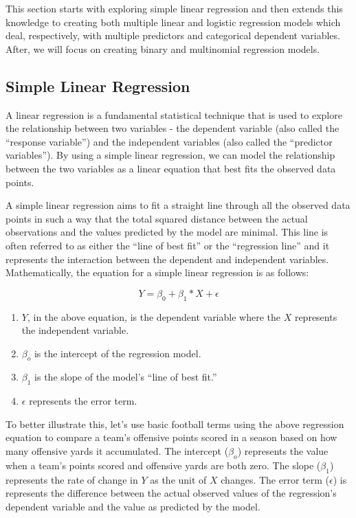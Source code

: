 \documentclass[
  letterpaper,
]{krantz}
\providecommand{\tightlist}{%
  \setlength{\itemsep}{0pt}\setlength{\parskip}{0pt}}\usepackage{longtable,booktabs,array}
\begin{document}
This section starts with exploring simple linear regression and then
extends this knowledge to creating both multiple linear and logistic
regression models which deal, respectively, with multiple predictors and
categorical dependent variables. After, we will focus on creating binary
and multinomial regression models.

\hypertarget{simple-linear-regression}{%
\subsection{Simple Linear Regression}\label{simple-linear-regression}}

A linear regression is a fundamental statistical technique that is used
to explore the relationship between two variables - the dependent
variable (also called the ``response variable'') and the independent
variables (also called the ``predictor variables''). By using a simple
linear regression, we can model the relationship between the two
variables as a linear equation that best fits the observed data points.

A simple linear regression aims to fit a straight line through all the
observed data points in such a way that the total squared distance
between the actual observations and the values predicted by the model
are minimal. This line is often referred to as either the ``line of best
fit'' or the ``regression line'' and it represents the interaction
between the dependent and independent variables. Mathematically, the
equation for a simple linear regression is as follows:

\[
Y = {\beta}_0 + {\beta}_1 * X + \epsilon
\]

\begin{enumerate}
\def\labelenumi{\arabic{enumi}.}
\tightlist
\item
  \(Y\), in the above equation, is the dependent variable where the
  \(X\) represents the independent variable.
\item
  \({\beta}_o\) is the intercept of the regression model.
\item
  \({\beta}_1\) is the slope of the model's ``line of best fit.''
\item
  \(\epsilon\) represents the error term.
\end{enumerate}

To better illustrate this, let's use basic football terms using the
above regression equation to compare a team's offensive points scored in
a season based on how many offensive yards it accumulated. The intercept
(\({\beta}_o\)) represents the value when a team's points scored and
offensive yards are both zero. The slope (\({\beta}_1\)) represents the
rate of change in \(Y\) as the unit of \(X\) changes. The error term
(\(\epsilon\)) is represents the difference between the actual observed
values of the regression's dependent variable and the value as predicted
by the model.
\end{document}
